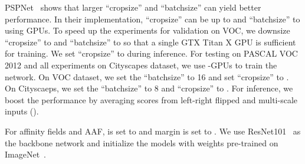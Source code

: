 PSPNet~\cite{zhao2016pyramid} shows that larger ``cropsize'' and ``batchsize'' can yield better performance. In their implementation, ``cropsize'' can be up to  and ``batchsize'' to  using  GPUs. To speed up the experiments for validation on VOC, we downsize ``cropsize'' to  and ``batchsize'' to  so that a single GTX Titan X GPU is sufficient for training.  We set ``cropsize'' to  during inference. For testing on PASCAL VOC 2012 and all experiments on Cityscapes dataset, we use -GPUs to train the network. On VOC dataset, we set the ``batchsize'' to 16 and set ``cropsize'' to . On Cityscaeps, we set the ``batchsize'' to 8 and ``cropsize'' to . For inference, we boost the performance by averaging scores from left-right flipped and multi-scale inputs (). 

For affinity fields and AAF,  is set to  and margin  is set to . We use ResNet101~\cite{he2016deep} as the backbone network and initialize the models with weights pre-trained on ImageNet~\cite{ILSVRC15}.

